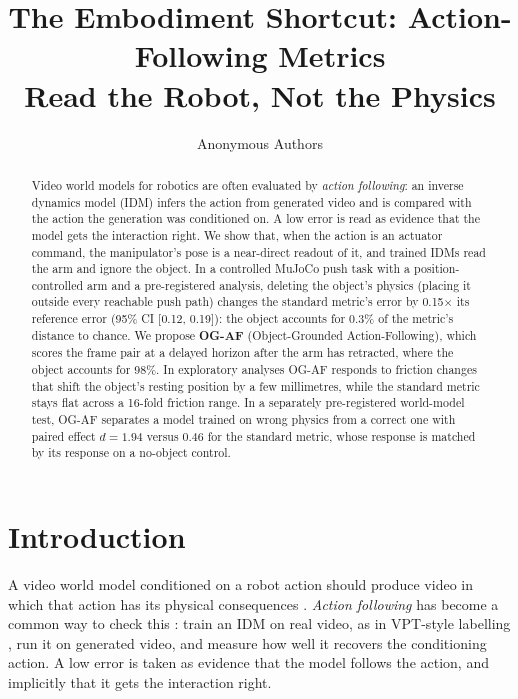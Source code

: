 \documentclass[10pt]{article}
\title{The Embodiment Shortcut: Action-Following Metrics\\Read the Robot, Not the Physics}
\author{Anonymous Authors}
\date{}
\begin{document}
\maketitle

\begin{abstract}
Video world models for robotics are often evaluated by \emph{action following}: an
inverse dynamics model (IDM) infers the action from generated video and is compared
with the action the generation was conditioned on. A low error is read as evidence
that the model gets the interaction right. We show that, when the action is an
actuator command, the manipulator's pose is a near-direct readout of it, and trained
IDMs read the arm and ignore the object. In a controlled MuJoCo push task with a
position-controlled arm and a pre-registered analysis, deleting the object's physics
(placing it outside every reachable push path) changes the standard metric's error by
0.15$\times$ its reference error (95\% CI [0.12, 0.19]): the object accounts for 0.3\%
of the metric's distance to chance. We propose \textbf{OG-AF} (Object-Grounded
Action-Following), which scores the frame pair at a delayed horizon after the arm has
retracted, where the object accounts for 98\%. In exploratory analyses OG-AF responds
to friction changes that shift the object's resting position by a few millimetres, while
the standard metric stays flat across a 16-fold friction range. In a separately
pre-registered world-model test, OG-AF separates a model trained on wrong physics from a
correct one with paired effect $d=1.94$ versus $0.46$ for the standard metric, whose
response is matched by its response on a no-object control.
\end{abstract}

\section{Introduction}

A video world model conditioned on a robot action should produce video in which that
action has its physical consequences \citep{yang2024unisim,bruce2024genie,nvidia2025cosmos,zhu2024irasim}.
\emph{Action following} has become a common way to check this
\citep{multiworld2026,followactions2026}: train an IDM on real video, as in VPT-style
labelling \citep{baker2022vpt}, run it on generated video, and measure how well it
recovers the conditioning action. A low error is taken as evidence that the model
follows the action, and implicitly that it gets the interaction right.
\end{document}
